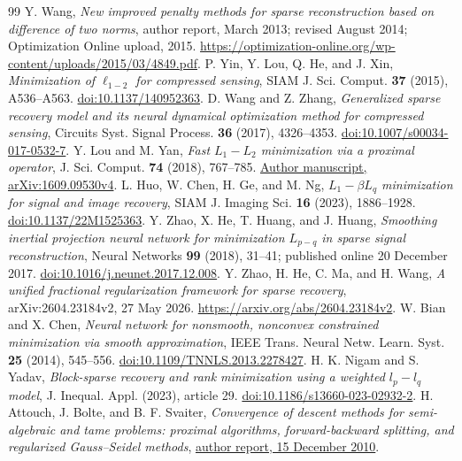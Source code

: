 \documentclass[11pt]{article}
\theoremstyle{remark}\newtheorem{remark}[theorem]{Remark}
\begin{document}
\begin{thebibliography}{99}
\footnotesize
\setlength{\itemsep}{1pt}
Y. Wang, \emph{New improved penalty methods for sparse reconstruction
based on difference of two norms}, author report, March 2013; revised
August 2014; Optimization Online upload, 2015.
\url{https://optimization-online.org/wp-content/uploads/2015/03/4849.pdf}.
P. Yin, Y. Lou, Q. He, and J. Xin,
\emph{Minimization of $\ell_{1-2}$ for compressed sensing},
SIAM J. Sci. Comput. \textbf{37} (2015), A536--A563.
\href{https://doi.org/10.1137/140952363}{doi:10.1137/140952363}.
D. Wang and Z. Zhang,
\emph{Generalized sparse recovery model and its neural dynamical
optimization method for compressed sensing},
Circuits Syst. Signal Process. \textbf{36} (2017), 4326--4353.
\href{https://doi.org/10.1007/s00034-017-0532-7}{doi:10.1007/s00034-017-0532-7}.
Y. Lou and M. Yan, \emph{Fast $L_1-L_2$ minimization via a proximal
operator}, J. Sci. Comput. \textbf{74} (2018), 767--785.
\href{https://arxiv.org/abs/1609.09530v4}{Author manuscript, arXiv:1609.09530v4}.
L. Huo, W. Chen, H. Ge, and M. Ng,
\emph{$L_1-\beta L_q$ minimization for signal and image recovery},
SIAM J. Imaging Sci. \textbf{16} (2023), 1886--1928.
\href{https://doi.org/10.1137/22M1525363}{doi:10.1137/22M1525363}.
Y. Zhao, X. He, T. Huang, and J. Huang,
\emph{Smoothing inertial projection neural network for minimization
$L_{p-q}$ in sparse signal reconstruction},
Neural Networks \textbf{99} (2018), 31--41; published online
20 December 2017.
\href{https://doi.org/10.1016/j.neunet.2017.12.008}{doi:10.1016/j.neunet.2017.12.008}.
Y. Zhao, H. He, C. Ma, and H. Wang,
\emph{A unified fractional regularization framework for sparse recovery},
arXiv:2604.23184v2, 27 May 2026.
\url{https://arxiv.org/abs/2604.23184v2}.
W. Bian and X. Chen,
\emph{Neural network for nonsmooth, nonconvex constrained minimization
via smooth approximation}, IEEE Trans. Neural Netw. Learn. Syst.
\textbf{25} (2014), 545--556.
\href{https://doi.org/10.1109/TNNLS.2013.2278427}{doi:10.1109/TNNLS.2013.2278427}.
H. K. Nigam and S. Yadav,
\emph{Block-sparse recovery and rank minimization using a weighted
$l_p-l_q$ model}, J. Inequal. Appl. (2023), article 29.
\href{https://doi.org/10.1186/s13660-023-02932-2}{doi:10.1186/s13660-023-02932-2}.
H. Attouch, J. Bolte, and B. F. Svaiter,
\emph{Convergence of descent methods for semi-algebraic and tame problems:
proximal algorithms, forward-backward splitting, and regularized
Gauss--Seidel methods},
\href{https://optimization-online.org/wp-content/uploads/2010/12/2864.pdf}{author report, 15 December 2010}.
\end{thebibliography}
\end{document}
